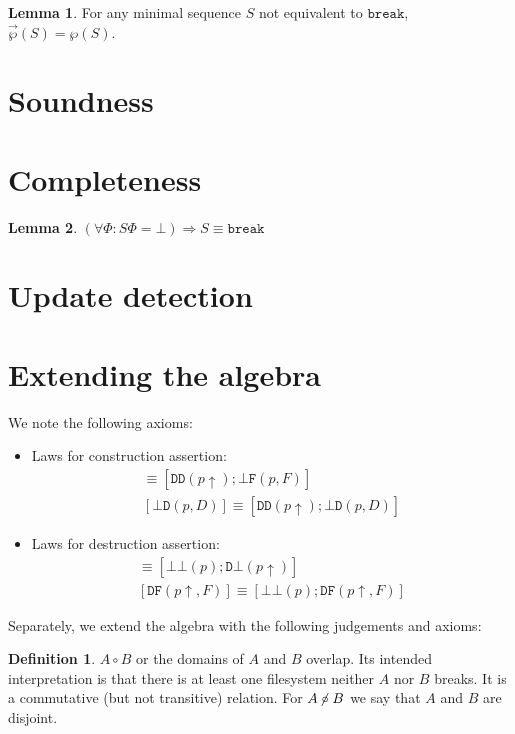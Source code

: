 \documentclass[12pt]{article}
\newcommand{\empt}{\bot}
\newcommand{\FS}{\Phi} %
\newcommand{\pp}{p\!\!\uparrow} %
\newcommand{\cbrk}{\mathtt{break}}
\newcommand{\fscommand}[2]{{#1#2}}
\newcommand{\fsregcommandchar}[1]{\mathtt{#1}}
\newcommand{\fsregcommand}[2]{\fscommand{\fsregcommandchar{#1}}{\fsregcommandchar{#2}}}
\newcommand{\cbb}{\fsregcommand{\empt}{\empt}}
\newcommand{\cbf}{\fsregcommand{\empt}{F}}
\newcommand{\cbd}{\fsregcommand{\empt}{D}}
\newcommand{\cdb}{\fsregcommand{D}{\empt}}
\newcommand{\cdf}{\fsregcommand{D}{F}}
\newcommand{\cdd}{\fsregcommand{D}{D}}
\newcommand{\coworks}{\circ}
\newcommand{\ncoworks}{\centernot\circ}
\newcommand{\extset}[1]{\wp({#1})}
\newcommand{\orderset}[1]{\vec{\wp}({#1})}
\theoremstyle{definition}
\newtheorem{mydef}{Definition}
\newtheorem{mylem}{Lemma}
\begin{document}
\begin{mylem}\label{lemma:minextorder}
For any minimal sequence $S$ not equivalent to $\cbrk$,
$\orderset{S} = \extset{S}$.
\end{mylem}


\section{Soundness}

\section{Completeness}

\begin{mylem}
\((\forall\FS: S\FS = \empt) \Rightarrow S \equiv \cbrk\)
\end{mylem}

\section{Update detection}

\section{Extending the algebra}

We note the following axioms:

\begin{itemize}
\item Laws for construction assertion:
   \begin{gather*}
            [\cbf(p, F)] \equiv [\cdd(\pp); \cbf(p, F)]\\
            [\cbd(p, D)] \equiv [\cdd(\pp); \cbd(p, D)]
   \end{gather*}
\item Laws for destruction assertion:
   \begin{gather*}
            [\cdb(\pp)] \equiv [\cbb(p); \cdb(\pp)]\\
            [\cdf(\pp, F)] \equiv [\cbb(p); \cdf(\pp, F)]
   \end{gather*}
\end{itemize}

Separately, we extend the algebra with the following judgements and axioms:

\begin{mydef}{$A\coworks B$}
or the domains of $A$ and $B$ overlap.
Its intended interpretation is that
there is at least one filesystem neither $A$ nor $B$ breaks.
It is a commutative (but not transitive) relation.
For $A\ncoworks B$ we say that $A$ and $B$ are disjoint.
\end{mydef}
\end{document}
